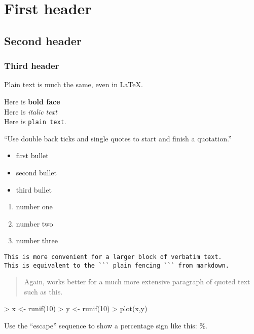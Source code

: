 \documentclass{article}
\begin{document}



\section{First header}
\subsection{Second header}
\subsubsection{Third header}

Plain text is much the same, even in \LaTeX.

Here is \textbf{bold face}\\
Here is \textit{italic text}\\
Here is \texttt{plain text}.

``Use double back ticks and single quotes to start and finish a quotation.''

\begin{itemize}
  \item first bullet
  \item second bullet
  \item third bullet
\end{itemize}

\begin{enumerate}
  \item number one
  \item number two
  \item number three
\end{enumerate}

\begin{verbatim}
This is more convenient for a larger block of verbatim text. 
This is equivalent to the ``` plain fencing ``` from markdown.
\end{verbatim}

\begin{quote}
Again, works better for a much more extensive paragraph of quoted text such as this.
\end{quote}

\begin{Schunk}
\begin{Sinput}
> x <- runif(10)
> y <- runif(10)
> plot(x,y)
\end{Sinput}
\end{Schunk}


Use the ``escape'' sequence to show a percentage sign like this: \%.
\end{document}
